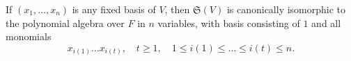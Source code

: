 If $(x_1, \dots, x_n)$ is any fixed basis of $V$, then $\mathfrak{S}(V)$ is canonically isomorphic to the polynomial algebra over $F$ in $n$ variables, with basis consisting of $1$ and all monomials
$$
x_{i(1)} \dots x_{i(t)}, \quad t \geq 1, \quad 1 \leq i(1) \leq \dots \leq i(t) \leq n.
$$
